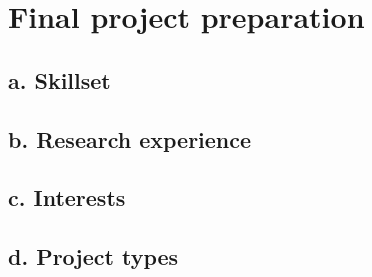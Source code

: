 \documentclass[a4paper]{article}
\begin{document}
\section{Final project preparation}

\subsection*{a. Skillset}

\subsection*{b. Research experience}

\subsection*{c. Interests}

\subsection*{d. Project types}
\end{document}
